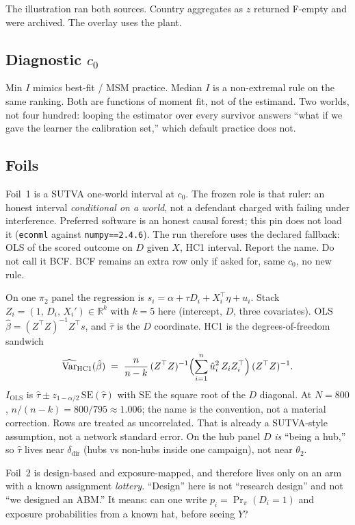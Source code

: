 \documentclass[11pt]{article}
\newcommand{\Iols}{I_{\mathrm{OLS}}}
\begin{document}
The illustration ran both sources. Country aggregates as $z$ returned
F-empty and were archived. The overlay uses the plant.

\subsection{Diagnostic $c_0$}
Min $I$ mimics best-fit / MSM practice. Median $I$ is a non-extremal
rule on the same ranking. Both are functions of moment fit, not of the
estimand. Two worlds, not four hundred: looping the estimator over
every survivor answers ``what if we gave the learner the calibration
set,'' which default practice does not.

\subsection{Foils}
\label{sec:design}
Foil~1 is a SUTVA one-world interval at $c_0$. The frozen role is that
ruler: an honest interval \emph{conditional on a world}, not a
defendant charged with failing under interference. Preferred software
is an honest causal forest; this pin does not load it
(\texttt{econml} against \texttt{numpy==2.4.6}). The run therefore uses
the declared fallback: OLS of the scored outcome on $D$ given $X$, HC1
interval. Report the name. Do not call it BCF. BCF remains an extra
row only if asked for, same $c_0$, no new rule.

On one $\pi_2$ panel the regression is
$s_i=\alpha+\tau D_i+X_i^\top\eta+u_i$. Stack
$Z_i=(1,\,D_i,\,X_i')\in\mathbb{R}^{k}$ with $k=5$ here
(intercept, $D$, three covariates). OLS
$\hat\beta=(Z^\top Z)^{-1}Z^\top s$, and $\hat\tau$ is the $D$
coordinate. HC1 is the degrees-of-freedom sandwich
\begin{equation}
  \widehat{\mathrm{Var}}_{\mathrm{HC1}}(\hat\beta)
  \;=\;
  \frac{n}{n-k}
  \,(Z^\top Z)^{-1}
  \Bigl(\sum_{i=1}^{n}\hat u_i^2\,Z_i Z_i^\top\Bigr)
  \,(Z^\top Z)^{-1}.
\end{equation}
$\Iols$ is $\hat\tau\pm z_{1-\alpha/2}\,\mathrm{SE}(\hat\tau)$ with
$\mathrm{SE}$ the square root of the $D$ diagonal. At $N=800$,
$n/(n-k)=800/795\approx 1.006$; the name is the convention, not a
material correction. Rows are treated as uncorrelated. That is already
a SUTVA-style assumption, not a network standard error. On the hub
panel $D$ \emph{is} ``being a hub,'' so $\hat\tau$ lives near
$\delta_{\mathrm{dir}}$ (hubs vs non-hubs inside one campaign), not
near $\theta_2$.

Foil~2 is design-based and exposure-mapped, and therefore lives only on
an arm with a known assignment \emph{lottery}. ``Design'' here is not
``research design'' and not ``we designed an ABM.'' It means: can one
write $p_i=\Pr_\pi(D_i=1)$ and exposure probabilities from a known hat,
before seeing $Y$?
\end{document}
